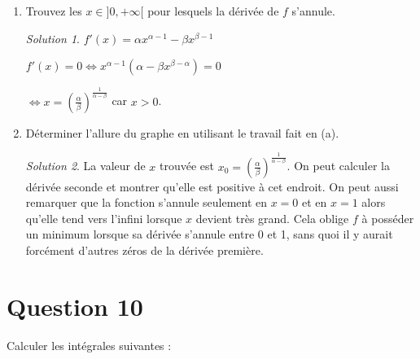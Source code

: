 \documentclass[
  12pt,
  letterpaper,
]{book}
\theoremstyle{remark}
\newtheorem*{solution}{Solution}
\begin{document}
\begin{enumerate}
\item
  Trouvez les \(x\in]0,+\infty[\) pour lesquels la dérivée de \(f\)
  s'annule.

  \begin{solution}

  \(f'(x) = \alpha x^{\alpha-1} - \beta x^{\beta-1}\)

  \(f'(x) = 0 \iff x^{\alpha-1}(\alpha - \beta x^{\beta-\alpha}) = 0\)

  \(\iff x = (\frac{\alpha}{\beta})^{\frac{1}{\alpha-\beta}}\) car
  \(x>0\).

  \end{solution}
\item
  Déterminer l'allure du graphe en utilisant le travail fait en (a).

  \begin{solution}

  La valeur de \(x\) trouvée est
  \(x_0 = (\frac{\alpha}{\beta})^{\frac{1}{\alpha-\beta}}\). On peut
  calculer la dérivée seconde et montrer qu'elle est positive à cet
  endroit. On peut aussi remarquer que la fonction s'annule seulement en
  \(x=0\) et en \(x=1\) alors qu'elle tend vers l'infini lorsque \(x\)
  devient très grand. Cela oblige \(f\) à posséder un minimum lorsque sa
  dérivée s'annule entre 0 et 1, sans quoi il y aurait forcément
  d'autres zéros de la dérivée première.

  \end{solution}
\end{enumerate}

\hypertarget{question-10-1}{%
\section{Question 10}\label{question-10-1}}

Calculer les intégrales suivantes :
\end{document}
